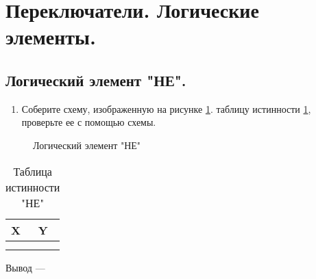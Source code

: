 \section{Переключатели. Логические элементы.}


\subsection{Логический элемент "НЕ".}

\begin{enumerate}
    \item Соберите схему, изображенную на рисунке \ref{ris:2.1}.
     таблицу истинности \ref{tab:2.1}, проверьте ее с помощью схемы.
\end{enumerate}

\begin{figure}[h]
\begin{minipage}[h]{0.5\linewidth}
\end{minipage}
\hfill
\begin{minipage}[h]{0.5\linewidth}
\end{minipage}
\caption{Логический элемент "НЕ"}
\label{ris:2.1}
\end{figure}


\begin{table}[h]
 \caption{Таблица истинности "НЕ"}
    \centering
    \begin{tabular}{|p{3cm}|p{3cm}|}
        \hline
        X  &  Y    \\
     
        \hline
        & \\
        \hline
        & \\
        \hline
    \end{tabular}
    \label{tab:2.1}
\end{table}

Вывод --- \hrulefill

